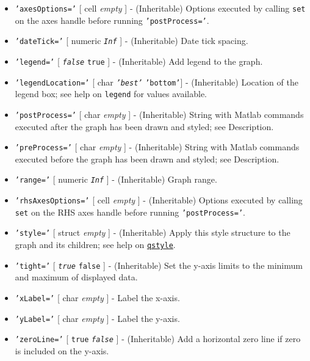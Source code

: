  \begin{itemize}
 \item
   \texttt{'axesOptions='} {[} cell \textbar{} \emph{empty} {]} -
   (Inheritable) Options executed by calling \texttt{set} on the axes
   handle before running \texttt{'postProcess='}.
 \item
   \texttt{'dateTick='} {[} numeric \textbar{} \emph{\texttt{Inf}} {]} -
   (Inheritable) Date tick spacing.
 \item
   \texttt{'legend='} {[} \emph{\texttt{false}} \textbar{} \texttt{true}
   {]} - (Inheritable) Add legend to the graph.
 \item
   \texttt{'legendLocation='} {[} char \textbar{} \emph{\texttt{'best'}}
   \textbar{} \texttt{'bottom'}{]} - (Inheritable) Location of the legend
   box; see help on \texttt{legend} for values available.
 \item
   \texttt{'postProcess='} {[} char \textbar{} \emph{empty} {]} -
   (Inheritable) String with Matlab commands executed after the graph has
   been drawn and styled; see Description.
 \item
   \texttt{'preProcess='} {[} char \textbar{} \emph{empty} {]} -
   (Inheritable) String with Matlab commands executed before the graph
   has been drawn and styled; see Description.
 \item
   \texttt{'range='} {[} numeric \textbar{} \emph{\texttt{Inf}} {]} -
   (Inheritable) Graph range.
 \item
   \texttt{'rhsAxesOptions='} {[} cell \textbar{} \emph{empty} {]} -
   (Inheritable) Options executed by calling \texttt{set} on the RHS axes
   handle before running \texttt{'postProcess='}.
 \item
   \texttt{'style='} {[} struct \textbar{} \emph{empty} {]} -
   (Inheritable) Apply this style structure to the graph and its
   children; see help on \href{qreport/qstyle}{\texttt{qstyle}}.
 \item
   \texttt{'tight='} {[} \emph{\texttt{true}} \textbar{} \texttt{false}
   {]} - (Inheritable) Set the y-axis limits to the minimum and maximum
   of displayed data.
 \item
   \texttt{'xLabel='} {[} char \textbar{} \emph{empty} {]} - Label the
   x-axis.
 \item
   \texttt{'yLabel='} {[} char \textbar{} \emph{empty} {]} - Label the
   y-axis.
 \item
   \texttt{'zeroLine='} {[} \texttt{true} \textbar{}
   \emph{\texttt{false}} {]} - (Inheritable) Add a horizontal zero line
   if zero is included on the y-axis.
 \end{itemize}
 
